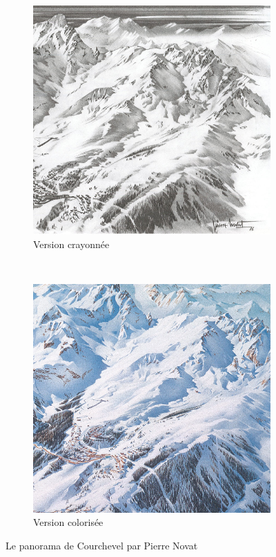 \begin{figure}[h!]
\centering
 \begin{subfigure}[t]{0.47\textwidth}
 \centering
 \includegraphics[width=1.0\linewidth]{novat/crayonn_.png}
 \caption{\label{fig:crayonne} Version crayonnée}
 \end{subfigure}%
 ~
 \hspace{.05\textwidth}
 \begin{subfigure}[t]{0.47\textwidth}
 \centering
 \includegraphics[width=1.0\linewidth]{novat/courchevel.png}
 \caption{\label{fig:courchevel} Version colorisée}
 \end{subfigure}
 \caption{Le panorama de Courchevel par Pierre Novat}
\end{figure}



